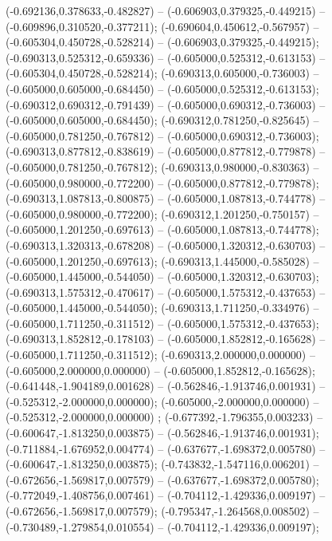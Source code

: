  (-0.692136,0.378633,-0.482827) -- (-0.606903,0.379325,-0.449215) -- (-0.609896,0.310520,-0.377211);
 (-0.690604,0.450612,-0.567957) -- (-0.605304,0.450728,-0.528214) -- (-0.606903,0.379325,-0.449215);
 (-0.690313,0.525312,-0.659336) -- (-0.605000,0.525312,-0.613153) -- (-0.605304,0.450728,-0.528214);
 (-0.690313,0.605000,-0.736003) -- (-0.605000,0.605000,-0.684450) -- (-0.605000,0.525312,-0.613153);
 (-0.690312,0.690312,-0.791439) -- (-0.605000,0.690312,-0.736003) -- (-0.605000,0.605000,-0.684450);
 (-0.690312,0.781250,-0.825645) -- (-0.605000,0.781250,-0.767812) -- (-0.605000,0.690312,-0.736003);
 (-0.690313,0.877812,-0.838619) -- (-0.605000,0.877812,-0.779878) -- (-0.605000,0.781250,-0.767812);
 (-0.690313,0.980000,-0.830363) -- (-0.605000,0.980000,-0.772200) -- (-0.605000,0.877812,-0.779878);
 (-0.690313,1.087813,-0.800875) -- (-0.605000,1.087813,-0.744778) -- (-0.605000,0.980000,-0.772200);
 (-0.690312,1.201250,-0.750157) -- (-0.605000,1.201250,-0.697613) -- (-0.605000,1.087813,-0.744778);
 (-0.690313,1.320313,-0.678208) -- (-0.605000,1.320312,-0.630703) -- (-0.605000,1.201250,-0.697613);
 (-0.690313,1.445000,-0.585028) -- (-0.605000,1.445000,-0.544050) -- (-0.605000,1.320312,-0.630703);
 (-0.690313,1.575312,-0.470617) -- (-0.605000,1.575312,-0.437653) -- (-0.605000,1.445000,-0.544050);
 (-0.690313,1.711250,-0.334976) -- (-0.605000,1.711250,-0.311512) -- (-0.605000,1.575312,-0.437653);
 (-0.690313,1.852812,-0.178103) -- (-0.605000,1.852812,-0.165628) -- (-0.605000,1.711250,-0.311512);
 (-0.690313,2.000000,0.000000) -- (-0.605000,2.000000,0.000000) -- (-0.605000,1.852812,-0.165628);
 (-0.641448,-1.904189,0.001628) -- (-0.562846,-1.913746,0.001931) -- (-0.525312,-2.000000,0.000000);
 (-0.605000,-2.000000,0.000000) -- (-0.525312,-2.000000,0.000000) ;
 (-0.677392,-1.796355,0.003233) -- (-0.600647,-1.813250,0.003875) -- (-0.562846,-1.913746,0.001931);
 (-0.711884,-1.676952,0.004774) -- (-0.637677,-1.698372,0.005780) -- (-0.600647,-1.813250,0.003875);
 (-0.743832,-1.547116,0.006201) -- (-0.672656,-1.569817,0.007579) -- (-0.637677,-1.698372,0.005780);
 (-0.772049,-1.408756,0.007461) -- (-0.704112,-1.429336,0.009197) -- (-0.672656,-1.569817,0.007579);
 (-0.795347,-1.264568,0.008502) -- (-0.730489,-1.279854,0.010554) -- (-0.704112,-1.429336,0.009197);
